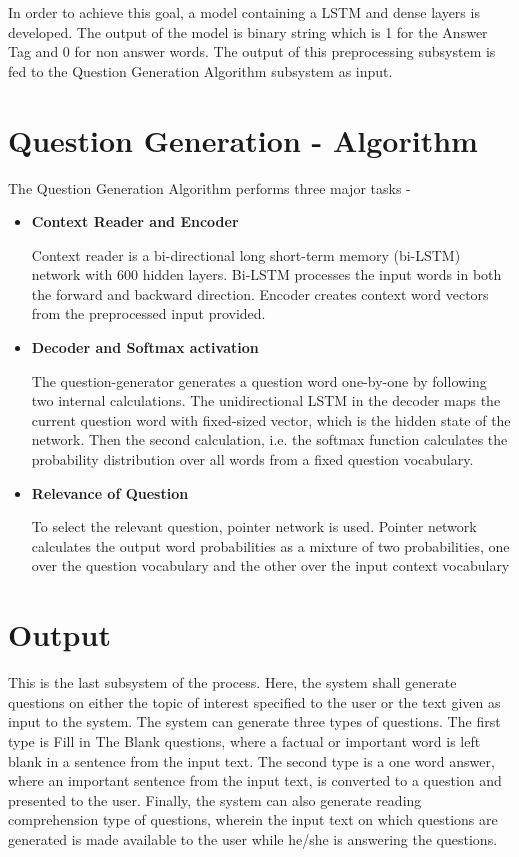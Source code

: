 In order to achieve this goal, a model containing a LSTM and dense layers is
developed. The output of the model is binary string which is 1 for the Answer Tag
and 0 for non answer words. The output of this preprocessing subsystem is fed to the Question Generation Algorithm subsystem as input. 

\section{Question Generation - Algorithm}

The Question Generation Algorithm performs three major tasks - 
\begin{itemize}

	\item \textbf{Context Reader and Encoder}

Context reader is a bi-directional long short-term memory (bi-LSTM) network with
		600 hidden layers. Bi-LSTM processes the input words in both the
		forward and backward direction. Encoder creates context word
		vectors from the preprocessed input provided.

\item \textbf{Decoder and Softmax activation}

	The question-generator generates a question word one-by-one by following
		two internal calculations. The unidirectional LSTM in the
		decoder maps the current question word with fixed-sized vector,
		which is the hidden state of the network. Then the second
		calculation, i.e. the softmax function calculates the
		probability distribution over all words from a fixed question
		vocabulary.

\item \textbf{Relevance of Question}

	To select the relevant question, pointer network is used. Pointer
		network calculates the output word probabilities as a mixture of
		two probabilities, one over the question vocabulary and the
		other over the input context vocabulary

\end{itemize}

\section{Output}

This is the last subsystem of the process. Here, the system shall generate questions on either the topic of interest
specified to the user or the text given as input to the system. The system can
generate three types of questions. The first type is Fill in The Blank
questions, where a factual or important word is left blank in a sentence from
the input text. The second type is a one word answer, where an important
sentence from the input text, is converted to a question and presented to the
user. Finally, the system can also generate reading comprehension type of
questions, wherein the input text on which questions are generated is made
available to the user while he/she is answering the questions.

